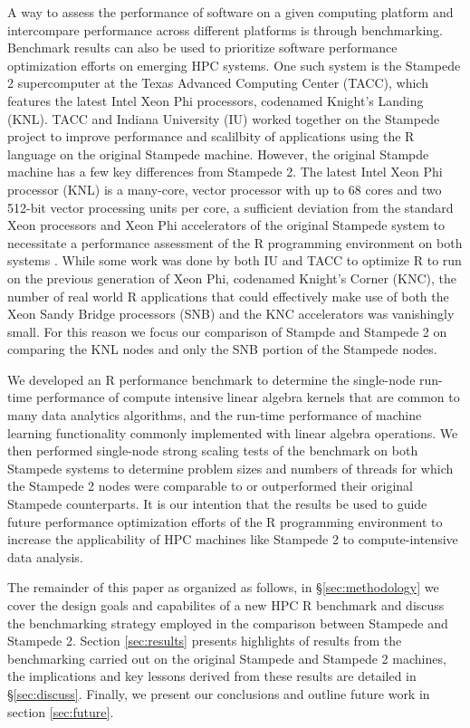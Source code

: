 A way to assess the performance of software on a given computing platform and intercompare
performance across different platforms is through benchmarking. Benchmark results can also
be used to prioritize software performance optimization efforts on emerging HPC systems.
One such system is the Stampede 2 supercomputer at the Texas Advanced Computing Center
(TACC), which features the latest Intel Xeon Phi processors, codenamed Knight's Landing
(KNL). TACC and  Indiana University (IU) worked together on the Stampede project to
improve performance and scalilbity of applications using the R language on the original
Stampede machine. However, the original Stampde machine has a few key differences from
Stampede 2. The latest Intel Xeon Phi processor (KNL) is a many-core, vector processor
with up to 68 cores and two 512-bit vector processing units per core, a sufficient
deviation from the standard Xeon processors and Xeon Phi accelerators of the original
Stampede system to necessitate a performance assessment of the R programming environment
on both systems \cite{tacc:stampedeGuide}. While some work was done by both IU and TACC to optimize R to run on the previous generation of Xeon Phi, codenamed Knight's Corner (KNC), the number of real world R applications that could effectively make use of both the Xeon Sandy Bridge processors (SNB) and the KNC accelerators was vanishingly small. For this reason we focus our comparison of Stampde and Stampede 2 on comparing the KNL nodes and only the SNB portion of the Stampede nodes.

We developed an R performance benchmark to determine the single-node run-time performance
of compute intensive linear algebra kernels that are common to many data analytics
algorithms, and the run-time performance of machine learning functionality commonly
implemented with linear algebra operations.  We then performed single-node strong scaling
tests of the benchmark on both Stampede systems to determine problem sizes and numbers of
threads for which the Stampede 2 nodes were comparable to or outperformed their original
Stampede counterparts.  It is our intention that the results be used to guide future
performance optimization efforts of the R programming environment to increase the
applicability of HPC machines like Stampede 2 to compute-intensive data
analysis.

The remainder of this paper as organized as follows, in \S\ref{sec:methodology} we cover the design goals and capabilites of a new HPC R benchmark and discuss the benchmarking strategy employed in the comparison between Stampede and Stampede 2. Section \ref{sec:results} presents highlights of results from the benchmarking carried out on the original Stampede and Stampede 2 machines, the implications and key lessons derived from these results are detailed in \S\ref{sec:discuss}. Finally, we present our conclusions and outline future work in section \ref{sec:future}.


